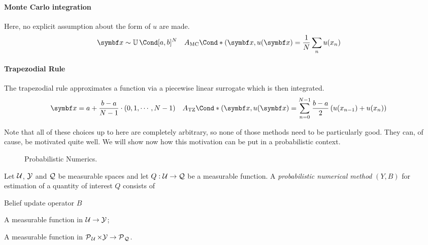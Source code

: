 \paragraph{Monte Carlo integration}
Here, no explicit assumption about the form of $u$ are made.
\begin{align}
    \mat{x}
        &\sim \Uniform{[a, b]^N}
        &\Fun*{A_{\text{MC}}}{(\mat{x}, u(\mat{x})}
        &= \frac{1}{N} \sum_n u(x_n)
\end{align}

\paragraph{Trapezodial Rule}
The trapezodial rule approximates a function via a piecewise linear surrogate which is then integrated.
\begin{align}
    \mat{x}
    &= a + \frac{b - a}{N - 1} \cdot (0, 1, \cdots, N - 1)
    &\Fun*{A_{\text{TZ}}}{(\mat{x}, u(\mat{x})}
    &= \sum_{n=0}^{N - 1} \frac{b - a}{2} \left( u(x_{n-1}) + u(x_n) \right)
\end{align}

Note that all of these choices up to here are completely arbitrary, so none of those methods need to be particularly good.
They can, of cause, be motivated quite well.
We will show now how this motivation can be put in a probabilistic context.


\begin{figure}[t]
    \centering
    
    \caption[Probabilistic Numerics]{
        Probabilistic Numerics.
        \label{fig:probabilistic_numerics}
    }
\end{figure}
\begin{definition}
    \label{def:probabilistic_numerical_method}
    Let $\mathcal{U}$, $\mathcal{Y}$ and $\mathcal{Q}$ be measurable spaces and let $Q: \mathcal{U} \to \mathcal{Q}$ be a measurable function.
    A \emph{probabilistic numerical method} $(Y, B)$ for estimation of a quantity of interest $Q$ consists of
    \begin{labeling}{Belief update operator $B$\quad}
        \item[Information operator $Y$] A measurable function in $\mathcal{U} \to \mathcal{Y}$;
        \item[Belief update operator $B$] A measurable function in $\operatorname{\mathcal{P}\mkern1mu}_{\mathcal{U}} \times \mathcal{Y} \to \operatorname{\mathcal{P}\mkern1mu}_{\mathcal{Q}}$.
    \end{labeling}
\end{definition}

